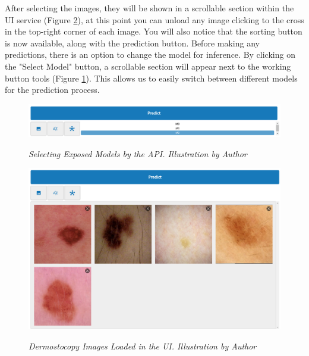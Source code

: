 After selecting the images, they will be shown in a scrollable section within
the UI service (Figure \ref{fig:loaded-images}), at this point you can
unload any image clicking to the cross in the top-right corner of each image.
You will also notice that the sorting button is now available, along with the
prediction button. Before making any predictions, there is an option to change
the model for inference. By clicking on the "Select Model" button, a scrollable
section will appear next to the working button tools (Figure
\ref{fig:selecting-model}). This allows us to easily switch between different
models for the prediction process.

\begin{figure}[H]
  \centering
  \includegraphics[width=\textwidth]{imatges/results/selecting-model.png}
  \caption[Selecting Exposed Models by the API]{\textit{Selecting Exposed Models by the API. Illustration by Author}}
  {\label{fig:selecting-model}}
\end{figure}


\begin{figure}[H]
  \centering
  \begin{adjustbox}{width=\textwidth, trim={0cm 3.5cm 0cm 0cm}, clip}
    \includegraphics[width=\textwidth]{imatges/results/loaded-images.png}
  \end{adjustbox}
  \caption[Dermostocopy Images Loaded in the UI]{\textit{Dermostocopy Images Loaded in the UI. Illustration by Author}}
  {\label{fig:loaded-images}}
\end{figure}

